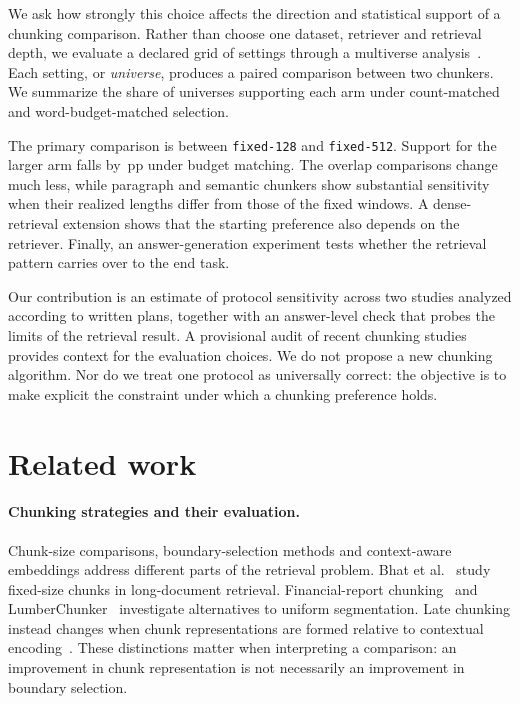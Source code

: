 \documentclass[11pt]{article}
\newcommand{\pp}{\ensuremath{\,\mathrm{pp}}}
\newcommand{\chunk}[1]{\texttt{#1}}
\begin{document}
We ask how strongly this choice affects the direction and statistical support of a chunking comparison. Rather than choose one dataset, retriever and retrieval depth, we evaluate a declared grid of settings through a multiverse analysis~\cite{steegen2016multiverse}. Each setting, or \emph{universe}, produces a paired comparison between two chunkers. We summarize the share of universes supporting each arm under count-matched and word-budget-matched selection.

The primary comparison is between \chunk{fixed-128} and \chunk{fixed-512}. Support for the larger arm falls by \HOneEst\pp{} under budget matching. The overlap comparisons change much less, while paragraph and semantic chunkers show substantial sensitivity when their realized lengths differ from those of the fixed windows. A dense-retrieval extension shows that the starting preference also depends on the retriever. Finally, an answer-generation experiment tests whether the retrieval pattern carries over to the end task.

Our contribution is an estimate of protocol sensitivity across two studies analyzed according to written plans, together with an answer-level check that probes the limits of the retrieval result. A provisional audit of recent chunking studies provides context for the evaluation choices. We do not propose a new chunking algorithm. Nor do we treat one protocol as universally correct: the objective is to make explicit the constraint under which a chunking preference holds.

\section{Related work}\label{sec:related}
\paragraph{Chunking strategies and their evaluation.}
Chunk-size comparisons, boundary-selection methods and context-aware embeddings address different parts of the retrieval problem. Bhat et al.~\cite{bhat2025chunksize} study fixed-size chunks in long-document retrieval. Financial-report chunking~\cite{jimenoyepes2024financial} and LumberChunker~\cite{duarte2024lumberchunker} investigate alternatives to uniform segmentation. Late chunking instead changes when chunk representations are formed relative to contextual encoding~\cite{gunther2024latechunking}. These distinctions matter when interpreting a comparison: an improvement in chunk representation is not necessarily an improvement in boundary selection.
\end{document}
